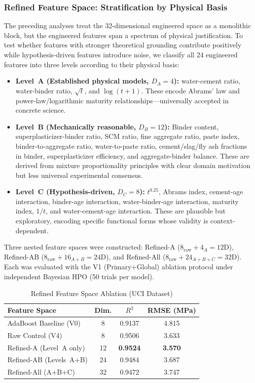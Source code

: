 \documentclass[journal]{IEEEtran}
\begin{document}
\subsubsection{Refined Feature Space: Stratification by Physical Basis}

The preceding analyses treat the 32-dimensional engineered space as a monolithic block, but the engineered features span a spectrum of physical justification. To test whether features with stronger theoretical grounding contribute positively while hypothesis-driven features introduce noise, we classify all 24 engineered features into three levels according to their physical basis:

\begin{itemize}
\item \textbf{Level~A (Established physical models, $D_A=4$):} water-cement ratio, water-binder ratio, $\sqrt{t}$, and $\log(t+1)$. These encode Abrams' law and power-law/logarithmic maturity relationships---universally accepted in concrete science.
\item \textbf{Level~B (Mechanically reasonable, $D_B=12$):} Binder content, superplasticizer-binder ratio, SCM ratio, fine aggregate ratio, paste index, binder-to-aggregate ratio, water-to-paste ratio, cement/slag/fly ash fractions in binder, superplasticizer efficiency, and aggregate-binder balance. These are derived from mixture proportionality principles with clear domain motivation but less universal experimental consensus.
\item \textbf{Level~C (Hypothesis-driven, $D_C=8$):} $t^{0.25}$, Abrams index, cement-age interaction, binder-age interaction, water-binder-age interaction, maturity index, $1/t$, and water-cement-age interaction. These are plausible but exploratory, encoding specific functional forms whose validity is context-dependent.
\end{itemize}

Three nested feature spaces were constructed: Refined-A ($8_{\text{raw}} + 4_A = 12$D), Refined-AB ($8_{\text{raw}} + 16_{A+B} = 24$D), and Refined-All ($8_{\text{raw}} + 24_{A+B+C} = 32$D). Each was evaluated with the V1 (Primary+Global) ablation protocol under independent Bayesian HPO (50 trials per model).

\begin{table}[!t]
\renewcommand{\arraystretch}{1.15}
\caption{Refined Feature Space Ablation (UCI Dataset)}
\label{tab:refined_feature_ablation}
\centering
\begin{tabular}{lccc}
\toprule
\textbf{Feature Space} & \textbf{Dim.} & \textbf{$R^2$} & \textbf{RMSE (MPa)} \\
\midrule
AdaBoost Baseline (V0) & 8 & 0.9137 & 4.815 \\
Raw Control (V4)       & 8  & 0.9506 & 3.633 \\
Refined-A (Level~A only) & 12 & \textbf{0.9524} & \textbf{3.570} \\
Refined-AB (Levels~A+B)  & 24 & 0.9484 & 3.687 \\
Refined-All (A+B+C)      & 32 & 0.9472 & 3.747 \\
\bottomrule
\end{tabular}
\end{table}
\end{document}

